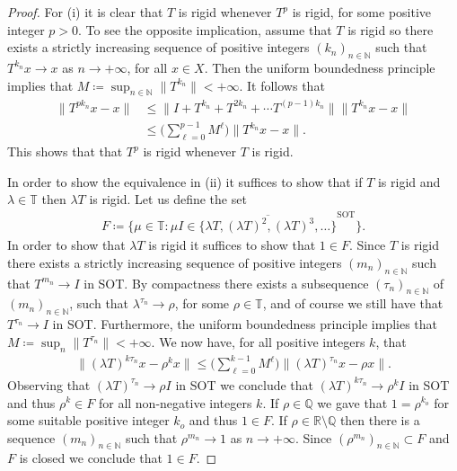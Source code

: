 \documentclass[12pt,leqno]{amsart}
\theoremstyle{plain}
\theoremstyle{definition}
\numberwithin{equation}{section}
\begin{document}
\begin{proof} For (i) it is clear that $T$ is rigid whenever $T^p$ is rigid, for some positive integer $p>0$. To see the opposite implication, assume that $T$ is rigid so there exists a strictly increasing sequence of positive integers $(k_n)_{n\in\mathbb N}$ such that $T^{k_n}x\to x$ as $n\to +\infty$, for all $x\in X$. Then the uniform boundedness principle implies that $M\coloneqq \sup_{n\in\mathbb N} \|T^{k_n}\| <+\infty.$ It follows that
\begin{align*}
 \|T^{pk_n}x-x\|&\leq \|I+T^{k_n}+T^{2 k_n}+\cdots T^{(p-1)k_n}\| \|T^{k_n}x-x\|
\\
&\leq \bigg(\sum_{\ell=0} ^{p-1}M^\ell\bigg) \|T^{k_n}x-x\|.
\end{align*}
This shows that that $T^p$ is rigid whenever $T$ is rigid.

In order to show the equivalence in (ii) it suffices to show that if $T$ is rigid and $\lambda \in\mathbb T$ then $\lambda T$ is rigid. Let us define the set
\begin{align*}
 F\coloneqq \big\{\mu\in\mathbb T: \mu I\in \overline{\{\lambda T,(\lambda T)^2,(\lambda T)^3,\ldots\}}^{\operatorname{SOT}} \big\}.
\end{align*}
In order to show  that $\lambda T$ is rigid it suffices to show that $1\in F$. Since $T$ is rigid there exists a strictly increasing sequence of positive integers $(m_n)_{n\in\mathbb N}$ such that $T^{m_n}\to I$ in SOT. By compactness there exists a subsequence $(\tau_n)_{n\in\mathbb N}$ of $(m_n)_{n\in\mathbb N}$, such that $\lambda ^{\tau_n}\to \rho$, for some $\rho \in \mathbb T$, and of course we still have that $T^{\tau_n}\to I$ in SOT. Furthermore, the uniform boundedness principle implies that $M\coloneqq \sup_n \|T^{\tau_n}\|<+\infty$. We now have, for all positive integers $k$, that
\begin{align*}
 \|(\lambda T)^{k\tau_n}x-\rho^k x\| \leq \bigg(\sum_{\ell=0} ^{k-1}M^\ell\bigg) \|(\lambda T)^{\tau _n}x-\rho x\|.
\end{align*}
Observing that $(\lambda T)^{\tau_n} \to \rho I$ in SOT we conclude that $(\lambda T)^{k\tau_n}\to \rho^k I$ in SOT and thus $\rho^k \in F$ for all non-negative integers $k$. If $\rho\in\mathbb Q$ we gave that $1=\rho^{k_o}$ for some suitable positive integer $k_o$ and thus $1\in F$. If $\rho \in \mathbb R\setminus \mathbb Q$ then there is a sequence $(m_n)_{n\in\mathbb N}$ such that $\rho^{m_n}\to 1$ as $n\to +\infty$. Since $(\rho^{m_n})_{n\in\mathbb N} \subset F$ and $F$ is closed we conclude that $1\in F$.
\end{proof}
\end{document}
